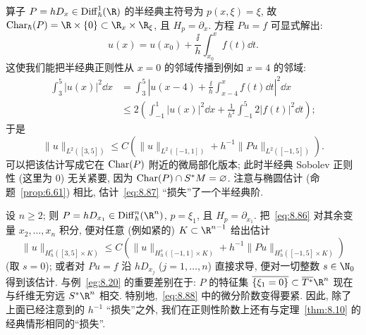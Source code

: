 \begin{example}[$hD_x$]\label{eg:8.20}
算子 $P = hD_x \in \Diff_\hbar^1(\R)$ 的半经典主符号为 $p(x, \xi) = \xi$, 故 $\Char_\hbar(P) = \R \times \{0\} \subset \R_x \times \R_\xi$, 且 $H_p = \partial_x$. 方程 $Pu = f$ 可显式解出:
\begin{equation}\label{eq:8.85}
    u(x) = u(x_0) + \frac{\ii}{h}\int_{x_0}^x f(t) \dd t.
\end{equation}
这使我们能把半经典正则性从 $x = 0$ 的邻域传播到例如 $x = 4$ 的邻域:
\begin{equation}\label{eq:8.86}
    \begin{aligned}
        \int_3^5 | u(x) |^2 \dd x
        &= \int_3^5 \left| u(x - 4) + \frac{\ii}{h}\int_{x-4}^x f(t) \dd t \right|^2 \dd x \\
        &\le 2\left( \int_{-1}^1 | u(x) |^2 \dd x + \frac{1}{h^2}\int_{-1}^5 2| f(t) |^2 \dd t \right);
    \end{aligned}
\end{equation}
于是
\begin{equation}\label{eq:8.87}
    \| u \|_{L^2([3, 5])} \le C\left( \| u \|_{L^2([-1, 1])} + h^{-1}\| P u \|_{L^2([-1, 5])} \right).
\end{equation}
可以把该估计写成它在 $\operatorname{Char}(P)$ 附近的微局部化版本; 此时半经典 Sobolev 正则性 (这里为 $0$) 无关紧要, 因为 $\operatorname{Char}(P) \cap S^*M = \varnothing$. 注意与椭圆估计 (命题~\ref{prop:6.61}) 相比, 估计~\eqref{eq:8.87} ``损失''了一个半经典阶.
\end{example}

\begin{example}[$hD_{x_1}$]\label{eg:8.21}
设 $n \ge 2$; 则 $P = hD_{x_1} \in \Diff_\hbar^n(\R^n)$, $p = \xi_1$, 且 $H_p = \partial_{x_1}$. 把~\eqref{eq:8.86} 对其余变量 $x_2, \ldots, x_n$ 积分, 便对任意 (例如紧的) $K \subset \R^{n-1}$ 给出估计
\begin{equation}\label{eq:8.88}
    \| u \|_{H_h^s([3, 5] \times K)} \le C\left( \| u \|_{H_h^s([-1, 1] \times K)} + h^{-1}\| P u \|_{H_h^s([-1, 5] \times K)} \right)
\end{equation}
(取 $s = 0$); 或者对 $Pu = f$ 沿 $hD_{x_j}$ ($j = 1, \ldots, n$) 直接求导, 便对一切整数 $s \in \N_0$ 得到该估计. 与例~\ref{eg:8.20} 的重要差别在于: $P$ 的特征集 $\overline{\{\xi_1 = 0\}} \subset \overline{T^*}\R^n$ 现在与纤维无穷远 $S^*\R^n$ 相交. 特别地,~\eqref{eq:8.88} 中的微分阶数变得要紧. 因此, 除了上面已经注意到的 $h^{-1}$ ``损失''之外, 我们在正则性阶数上还有与定理~\ref{thm:8.10} 的经典情形相同的``损失''.
\end{example}

